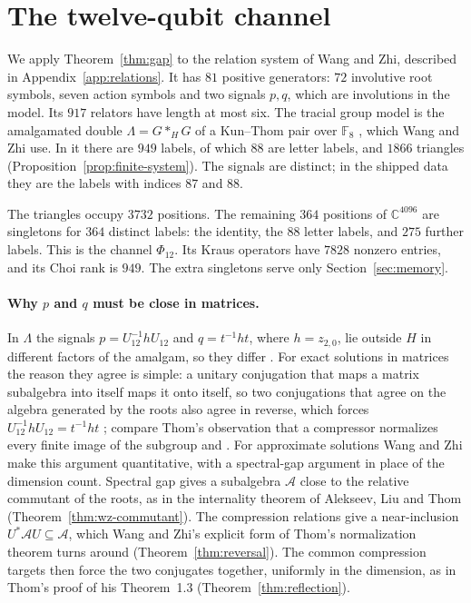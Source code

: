 \documentclass[11pt]{article}
\begin{document}
\section{The twelve-qubit channel}\label{sec:12q}

We apply Theorem~\ref{thm:gap} to the relation system of Wang and Zhi, described in Appendix~\ref{app:relations}.  It has $81$ positive generators: $72$ involutive root symbols, seven action symbols and two signals $p,q$, which are involutions in the model.  Its $917$ relators have length at most six.  The tracial group model is the amalgamated double $\Lambda=G*_HG$ of a Kun--Thom pair over $\mathbb F_8$ \cite[Theorem~E]{KunThom26}, which Wang and Zhi use.  In it there are $949$ labels, of which $88$ are letter labels, and $1866$ triangles (Proposition~\ref{prop:finite-system}).  The signals are distinct; in the shipped data they are the labels with indices $87$ and $88$.

The triangles occupy $3732$ positions.  The remaining $364$ positions of $\mathbb C^{4096}$ are singletons for $364$ distinct labels: the identity, the $88$ letter labels, and $275$ further labels.  This is the channel $\Phi_{12}$.  Its Kraus operators have $7828$ nonzero entries, and its Choi rank is $949$.  The extra singletons serve only Section~\ref{sec:memory}.

\paragraph{Why $p$ and $q$ must be close in matrices.}  In $\Lambda$ the signals $p=U_{12}^{-1}hU_{12}$ and $q=t^{-1}ht$, where $h=z_{2,0}$, lie outside $H$ in different factors of the amalgam, so they differ \cite[(2.9) and Lemma~2.2]{WangZhi26}.  For exact solutions in matrices the reason they agree is simple: a unitary conjugation that maps a matrix subalgebra into itself maps it onto itself, so two conjugations that agree on the algebra generated by the roots also agree in reverse, which forces $U_{12}^{-1}hU_{12}=t^{-1}ht$ \cite[Lemma~2.1]{WangZhi26}; compare Thom's observation that a compressor normalizes every finite image of the subgroup \cite[Remark~4.4]{Thom26} and \cite[Lemma~4]{MghirbiDouglasV1}.  For approximate solutions Wang and Zhi make this argument quantitative, with a spectral-gap argument in place of the dimension count.  Spectral gap gives a subalgebra $\mathcal A$ close to the relative commutant of the roots, as in the internality theorem of Alekseev, Liu and Thom (Theorem~\ref{thm:wz-commutant}).  The compression relations give a near-inclusion $U^*\mathcal AU\subseteq\mathcal A$, which Wang and Zhi's explicit form of Thom's normalization theorem turns around (Theorem~\ref{thm:reversal}).  The common compression targets then force the two conjugates together, uniformly in the dimension, as in Thom's proof of his Theorem~1.3 (Theorem~\ref{thm:reflection}).
\end{document}
